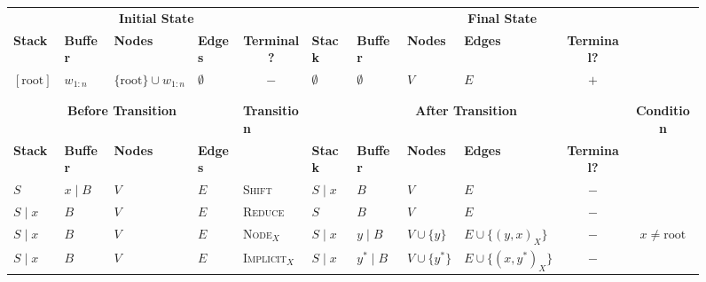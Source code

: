 \documentclass[11pt]{article}
\begin{document}
\begin{figure*}
\captionsetup{justification=centering}
\begin{adjustbox}{width=\textwidth,margin=3pt,frame}
\begin{tabular}{llll|l|llllc|c}
\multicolumn{5}{c|}{\textbf{\small Initial State}} & \multicolumn{6}{c}{\textbf{\small Final State}} \\
\textbf{\footnotesize Stack} & \textbf{\footnotesize Buffer} & \textbf{\footnotesize Nodes} & \multicolumn{1}{l}{\textbf{\footnotesize Edges}} & \multicolumn{1}{c|}{\textbf{\footnotesize Terminal?}} & \textbf{\footnotesize Stack} & \textbf{\footnotesize Buffer} & \textbf{\footnotesize Nodes} & \textbf{\footnotesize Edges} & \multicolumn{1}{c}{\textbf{\footnotesize Terminal?}} \\
$[\mathrm{root}]$ & $w_{1:n}$ & \multirow{2}{40pt}{$\{\mathrm{root}\} \cup w_{1:n}$} & \multicolumn{1}{l}{$\emptyset$} & \multicolumn{1}{c|}{$-$} & $\emptyset$ & $\emptyset$ & $V$ & $E$ & \multicolumn{1}{c}{$+$} \\ 
\multicolumn{5}{c|}{} \\
\multicolumn{5}{c|}{} \\
\hline
\multicolumn{4}{c|}{\textbf{\small Before Transition}} & \textbf{\small Transition} & \multicolumn{5}{c|}{\textbf{\small After Transition}} & \textbf{\small Condition} \\
\textbf{\footnotesize Stack} & \textbf{\footnotesize Buffer} & \textbf{\footnotesize Nodes} & \textbf{\footnotesize Edges} & & \textbf{\footnotesize Stack} & \textbf{\footnotesize Buffer} & \textbf{\footnotesize Nodes} & \textbf{\footnotesize Edges} & \textbf{\footnotesize Terminal?} & \\
$S$ & $x \;|\; B$ & $V$ & $E$ & \textsc{Shift} & $S \;|\; x$ & $B$ & $V$ & $E$ & $-$ & \\
$S \;|\; x$ & $B$ & $V$ & $E$ & \textsc{Reduce} & $S$ & $B$ & $V$ & $E$ & $-$ & \\
\cline{11-11}
$S \;|\; x$ & $B$ & $V$ & $E$ & \textsc{Node$_X$} & $S \;|\; x$ & $y \;|\; B$ & $V \cup \{ y \}$ & $E \cup \{ (y,x)_X \}$ & $-$ &
$x \neq \mathrm{root}$ \\
\cline{11-11}
$S \;|\; x$ & $B$ & $V$ & $E$ & \textsc{Implicit$_X$} & $S \;|\; x$ & $y^* \;|\; B$ & $V \cup \{ y^* \}$ & $E \cup \{ (x,y^*)_X \}$ & $-$ &

\end{tabular}
\end{adjustbox}
\end{figure*}
\end{document}
